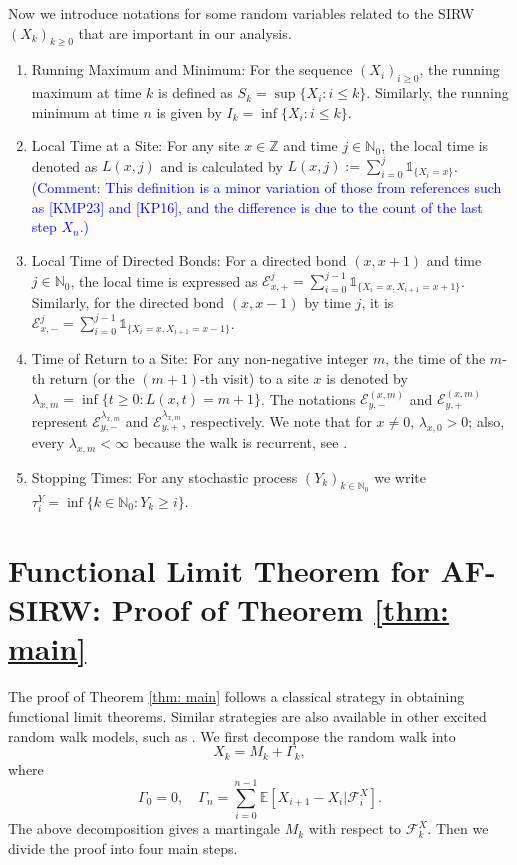 \documentclass[twoside,12pt, a4paper]{article}
\numberwithin{equation}{section}
\theoremstyle{remark}
\newcommand{\comment}[1]{\textcolor{blue}{(Comment: #1)}}
\begin{document}
	Now we introduce notations for some random variables related to the SIRW $(X_k)_{k\geq0}$ that are important in our analysis.
	\begin{enumerate}
		\item Running Maximum and Minimum: For the sequence $(X_i)_{i \ge 0}$, the running maximum at time $k$ is defined as $S_k = \sup\{X_i : i \le k\}$. Similarly, the running minimum at time $n$ is given by $I_k = \inf \{X_i: i \le k\}$.
		\item
		Local Time at a Site: For any site $x \in \mathbb{Z}$ and time $j \in \mathbb{N}_0$, the local time is denoted as $L(x,j)$ and is calculated by $L(x,j):= \sum_{i=0}^j \mathbb{1}_{\{X_i=x\}}$. 
		\comment{This definition is a minor variation of those from references such as [KMP23] and [KP16], and the difference is due to the count of the last step $X_n$.}
		\item
		Local Time of Directed Bonds: For a directed bond $(x,x+1)$ and time $j \in \mathbb{N}_0$, the local time is expressed as $\mathcal{E}^j_{x,+} = \sum_{i=0}^{j-1} \mathbb{1}_{\{X_i=x, X_{i+1} =x+1\}}$. Similarly, for the directed bond $(x,x-1)$ by time $j$, it is $\mathcal{E}^j_{x,-} = \sum_{i=0}^{j-1} \mathbb{1}_{\{X_i=x, X_{i+1} =x-1\}}$.
		\item
		Time of Return to a Site: For any non-negative integer $m$, the time of the $m$-th return (or the $(m+1)$-th visit) to a site $x$ is denoted by $\lambda_{x,m} = \inf\{t \geq 0: L(x,t) = m+1\}$. The notations $\mathcal{E}^{(x,m)}_{y, -}$ and $\mathcal{E}^{(x,m)}_{y, +}$ represent $\mathcal{E}^{\lambda_{x,m}}_{y,-}$ and $\mathcal{E}^{\lambda_{x,m}}_{y,+}$, respectively. We note that for $x\neq 0$, $\lambda_{x,0} > 0$; also, every $\lambda_{x,m}<\infty$ because the walk is recurrent, see \cite{T96}.
		\item
		Stopping Times: For any stochastic process $(Y_k)_{k \in \mathbb{N}_0}$ we write $\tau^Y_{i} = \inf \{k \in  \mathbb{N}_0: Y_k \ge  i\}$.
	\end{enumerate}
	\section{Functional Limit Theorem for AF-SIRW: Proof of Theorem \ref{thm: main}}
	\label{sec: proof of main}
	
	The proof of Theorem \ref{thm: main} follows a classical strategy in obtaining functional limit theorems. 
	Similar strategies are also available in other excited random walk models, such as \cite{KP16,KMP23}.
	We first decompose the random walk into
	\begin{equation}
		\label{eqn:decomposition}
		X_k = M_k+ \Gamma_k 
		,\end{equation} 
	where
	\[ 
	\Gamma_0 = 0, \quad \Gamma_n = \sum_{i=0}^{n-1} \mathbb{E}\left[ X_{i+1}-X_i | \mathcal{F}_i^X 
	\right].
	\]
	The above decomposition gives a martingale $M_k$ with respect to $\mathcal{F}_k^X.$ 
	Then we divide the proof into four main steps. 
	
\end{document}
